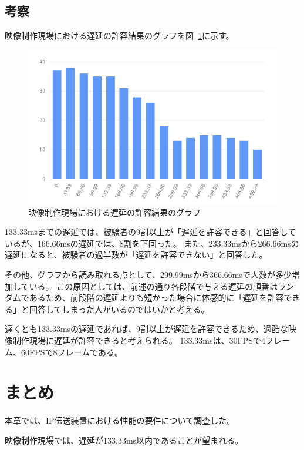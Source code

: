 \subsection{考察}

映像制作現場における遅延の許容結果のグラフを図~\ref{fig:mv-delay-result-graph}に示す。

\begin{figure}[htbp]
  \begin{center}
    \includegraphics[bb=0 0 600 371,width=13cm]{img/mv-delay-result-graph.png}
  \end{center}
  \caption{映像制作現場における遅延の許容結果のグラフ}
  \label{fig:mv-delay-result-graph}
\end{figure}

133.33msまでの遅延では、被験者の9割以上が「遅延を許容できる」と回答しているが、166.66msの遅延では、8割を下回った。
また、233.33msから266.66msの遅延になると、被験者の過半数が「遅延を許容できない」と回答した。

その他、グラフから読み取れる点として、299.99msから366.66msで人数が多少増加している。
この原因としては、前述の通り各段階で与える遅延の順番はランダムであるため、前段階の遅延よりも短かった場合に体感的に「遅延を許容できる」と回答してしまった人がいるのではいかと考える。

遅くとも133.33msの遅延であれば、9割以上が遅延を許容できるため、過酷な映像制作現場に遅延が許容できると考えられる。
133.33msは、30FPSで4フレーム、60FPSで8フレームである。

\section{まとめ}
本章では、IP伝送装置における性能の要件について調査した。

映像制作現場では、遅延が133.33ms以内であることが望まれる。

